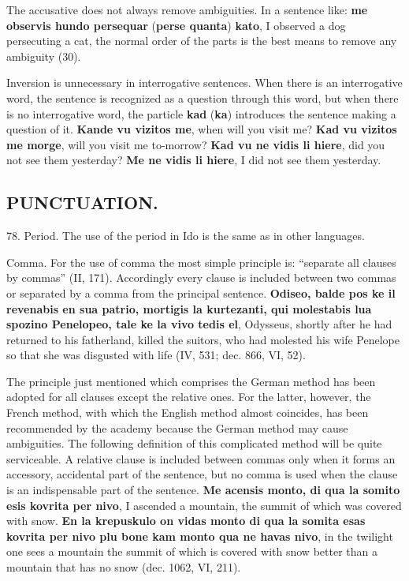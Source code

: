 The accusative does not always remove ambiguities. In a sentence like: \textbf{me observis hundo persequar} (\textbf{perse quanta}) \textbf{kato}, I observed a dog persecuting a cat, the normal order of the parts is the best means to remove any ambiguity (30). 

Inversion is unnecessary in interrogative sentences. When there is an interrogative word, the sentence is recognized as a question through this word, but when there is no interrogative word, the particle \textbf{kad }(\textbf{ka}) introduces the sentence making a question of it. \textbf{Kande vu vizitos me}, when will you visit me? \textbf{Kad vu vizitos me morge}, will you visit me to-morrow? \textbf{Kad vu ne vidis li hiere}, did you not see them yesterday? \textbf{Me ne vidis li hiere}, I did not see them yesterday.

\subsection*{PUNCTUATION.}
78. Period. The use of the period in Ido is the same as in other languages. 

Comma. For the use of comma the most simple principle is: ``separate all clauses by commas'' (II, 171). Accordingly every clause is included between two commas or separated by a comma from the principal sentence. \textbf{Odiseo, balde pos ke il revenabis en sua patrio, mortigis la kurtezanti, qui molestabis lua spozino Penelopeo, tale ke la vivo tedis el}, Odysseus, shortly after he had returned to his fatherland, killed the suitors, who had molested his wife Penelope so that she was disgusted with life (IV, 531; dec. 866, VI, 52). 

The principle just mentioned which comprises the German method has been adopted for all clauses except the relative ones. For the latter, however, the French method, with which the English method almost coincides, has been recommended by the academy because the German method may cause ambiguities. The following definition of this complicated method will be quite serviceable. A relative clause is included between commas only when it forms an accessory, accidental part of the sentence, but no comma is used when the clause is an indispensable part of the sentence. \textbf{Me acensis monto, di qua la somito esis kovrita per nivo}, I ascended a mountain, the summit of which was covered with snow. \textbf{En la krepuskulo on vidas monto di qua la somita esas kovrita per nivo plu bone kam monto qua ne havas nivo}, in the twilight one sees a mountain the summit of which is covered with snow better than a mountain that has no snow (dec. 1062, VI, 211). 

